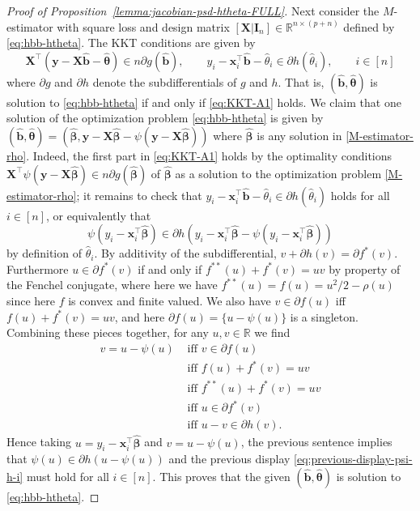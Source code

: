 \documentclass[11pt]{amsart}
\numberwithin{equation}{section}
\numberwithin{equation}{section}
\def\real{{\mathbb{R}}}
\def\R{{\real}}
\def\mathbold{\boldsymbol} %
\def\bb{\mathbold{b}}\def\bhat{\widehat{b}}\def\btil{\widetilde{b}}
\def\hbb{{\widehat{\bb}}}\def\tbb{{\widetilde{\bb}}}\def\bbbar{{\overline \bb}}
\def\bI{\mathbold{I}}\def\hbI{{\widehat{\bI}}}\def\tbI{{\widetilde{\bI}}}
\def\bx{\mathbold{x}}\def\xhat{\widehat{x}}\def\xtil{\widetilde{x}}\def\xbar{{\overline x}}\def\vbx{{\bf x}}
\def\bX{\mathbold{X}}\def\hbX{{\widehat{\bX}}}\def\tbX{{\widetilde{\bX}}}\def\bXbar{{\overline \bX}}
\def\by{\mathbold{y}}\def\yhat{\widehat{y}}\def\ytil{\widetilde{y}}\def\ybar{{\overline y}}\def\vby{{\bf y}}
\def\bbeta{\mathbold{\beta}}\def\betahat{\widehat{\beta}}\def\hbeta{\widehat{\beta}}
\def\hbbeta{{{\widehat{\bbeta}}}}
\def\btheta{\mathbold{\theta}}\def\thetahat{\widehat{\theta}}\def\htheta{\widehat{\theta}}
\def\hbtheta{{\widehat{\btheta}}}\def\tbtheta{{\widetilde{\btheta}}}
\begin{document}
\begin{proof}[Proof of Proposition~\ref{lemma:jacobian-psd-htheta-FULL}]
    Next consider the $M$-estimator with square loss
    and design matrix $[\bX | \bI_n]\in\R^{n\times (p+n)}$ defined by
    \eqref{eq:hbb-htheta}.
    The KKT conditions are given by
    \begin{equation}
        \label{eq:KKT-A1}
    \bX^\top(\by - \bX\hbb - \hbtheta)\in n \partial g(\hbb),
    \qquad
    y_i-\bx_i^\top\hbb - \htheta_i \in \partial h(\htheta_i), \qquad i\in[n]
    \end{equation}
    where $\partial g$ and $\partial h$ denote the subdifferentials of $g$ and $h$. That is,
    $(\hbb,\hbtheta)$  is solution to \eqref{eq:hbb-htheta}
    if and only if \eqref{eq:KKT-A1} holds.
    We claim that one solution of the optimization problem
    \eqref{eq:hbb-htheta} is given by
    $(\hbb,\hbtheta) = (\hbbeta,\by-\bX\hbbeta - \psi(\by-\bX\hbbeta))$
    where $\hbbeta$ is any solution in \eqref{M-estimator-rho}.
    Indeed, the first part in \eqref{eq:KKT-A1}
    holds by the optimality conditions $\bX^\top\psi(\by-\bX\hbbeta)\in n \partial g(\hbbeta)$ of $\hbbeta$ as a solution to the optimization problem
    \eqref{M-estimator-rho}; it remains to check 
    that $y_i-\bx_i^\top\hbb - \htheta_i\in\partial h(\htheta_i)$
    holds for all $i\in[n]$, or equivalently
    that 
    \begin{equation}
        \label{eq:previous-display-psi-h-i}
    \psi(y_i-\bx_i^\top\hbbeta)\in \partial h(
        y_i-\bx_i^\top\hbbeta - \psi(y_i-\bx_i^\top\hbbeta)
    )
    \end{equation}
    by definition of $\htheta_i$.
    By additivity of the subdifferential,
    $v + \partial h(v)=\partial f^*(v)$.
    Furthermore $u\in\partial f^*(v)$ if and only 
    if $f^{**}(u) + f^*(v) = uv$ by property of the Fenchel conjugate,
    where here we have
    $f^{**}(u)=f(u)=u^2/2 - \rho(u)$ since here $f$ is convex and finite valued.
    We also have $v\in \partial f(u)$
    iff $f(u) + f^*(v) = uv$,
    and here $\partial f(u) = \{u - \psi(u)\}$ is a singleton.
    Combining these pieces together, for any $u,v\in\R$ we find
    \begin{align*}
        v= u - \psi(u)
     &\text{ iff }
        v\in \partial f(u) %
     \\&\text{ iff }
        f(u) + f^*(v) = uv
     \\&\text{ iff }
     f^{**}(u) + f^*(v) = uv
     \\&\text{ iff }
        u \in \partial f^*(v)
     \\&\text{ iff }
        u - v \in\partial h(v).
    \end{align*}
    Hence taking $u=y_i - \bx_i^\top\hbbeta$
    and $v=u-\psi(u)$, the previous sentence implies that
    $\psi(u)\in \partial h(u-\psi(u))$
    and the previous display \eqref{eq:previous-display-psi-h-i} must hold for all $i\in [n]$.
    This proves that the given $(\hbb,\hbtheta)$ is solution
    to \eqref{eq:hbb-htheta}.
\end{proof}
\end{document}
